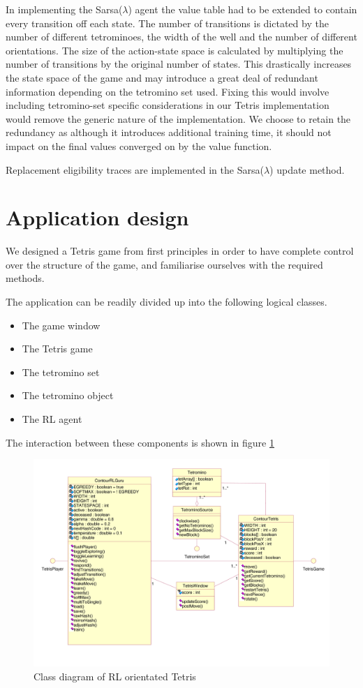 \documentclass{rucsthesis}
\begin{document}
In implementing the Sarsa($\lambda$) agent the value table had to be extended to contain every transition off each state. The number of transitions is dictated by the number of different tetrominoes, the width of the well and the number of different orientations.  The size of the action-state space is calculated by multiplying the number of transitions by the original number of states. This drastically increases the state space of the game and may introduce a great deal of redundant information depending on the tetromino set used. Fixing this would involve including tetromino-set specific considerations in our Tetris implementation would remove the generic nature of the implementation. We choose to retain the redundancy as although it introduces additional training time, it should not impact on the final values converged on by the value function.

Replacement eligibility traces are implemented in the Sarsa($\lambda$) update method. 

\section{Application design}

We designed a Tetris game from first principles in order to have complete control over the structure of the game, and familiarise ourselves with the required methods.

The application can be readily divided up into the following logical classes.

\begin{itemize}
\item{The game window}
\item{The Tetris game}
\item{The tetromino set}
\item{The tetromino object}
\item{The RL agent}
\end{itemize}

The interaction between these components is shown in figure \ref{fig:uml}

\begin{figure}[h]
\centering
\includegraphics[width=6in]{finaluml.png}
\caption{Class diagram of RL orientated Tetris}
\label{fig:uml}
\end{figure}
\end{document}
